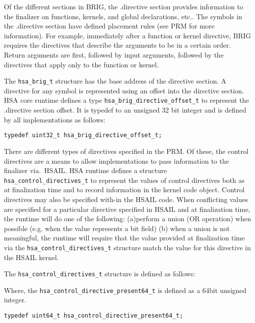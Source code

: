 

Of the different sections in BRIG, the .directive section provides
information to the finalizer on functions, kernels, and global
declarations, etc.. The symbols in the .directive section have defined
placement rules (see PRM for more information). For example,
immediately after a function or kernel directive, BRIG requires the
directives that describe the arguments to be in a certain order.
Return arguments are first, followed by input arguments, followed by
the directives that apply only to the function or kernel.

The \texttt{hsa\_brig\_t} structure has the base address of the
directive section. A directive for any symbol is represented using
an offset into the directive section. HSA core runtime defines a
type \texttt{hsa\_brig\_directive\_offset\_t} to represent the
.directive section offset. It is typedef to an unsigned 32 bit
integer and is defined by all implementations as follows:

\begin{lstlisting}
typedef uint32_t hsa_brig_directive_offset_t;
\end{lstlisting}

There are different types of directives specified in the PRM. Of
these, the control directives are a means to allow implementations
to pass information to the finalizer via.\ HSAIL. HSA runtime
defines a structure \texttt{hsa\_control\_directives\_t} to
represent the values of control directives both as at finalization
time and to record information in the kernel code object. Control
directives may also be specified with-in the HSAIL code. When
conflicting values are specified for a particular directive
specified in HSAIL and at finalization time, the runtime will do one
of the following: (a)perform a union (OR operation) when possible
(e.g. when the value represents a bit field) (b) when a union is not
meaningful, the runtime will require that the value provided at
finalization time via the \texttt{hsa\_control\_directives\_t}
structure match the value for this directive in the HSAIL kernel. 

The \texttt{hsa\_control\_directives\_t} structure is defined as
follows:



Where, the \texttt{hsa\_control\_directive\_present64\_t} is defined
as a 64bit unsigned integer.

\begin{lstlisting}
typedef uint64_t hsa_control_directive_present64_t;
\end{lstlisting}

